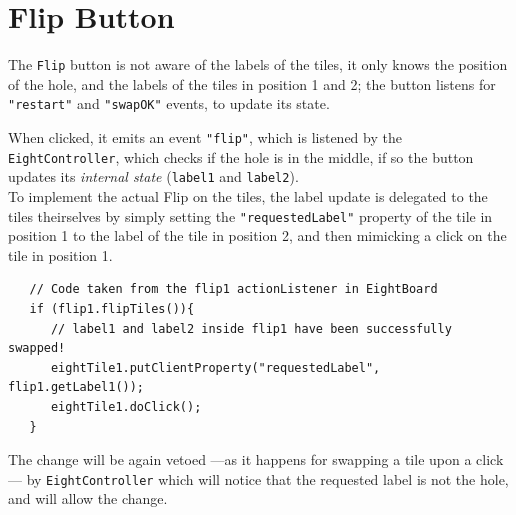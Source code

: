 
\section{Flip Button}

The \lstinline|Flip| button is not aware of the labels of the tiles, it only knows the position of the hole, and the labels of the tiles in position 1 and 2; the button listens for \lstinline|"restart"| and \lstinline|"swapOK"| events, to update its state.

When clicked, it emits an event \lstinline|"flip"|, which is listened by the \lstinline|EightController|, which checks if the hole is in the middle, if so the button updates its \textit{internal state} (\lstinline|label1| and \lstinline|label2|).\\
To implement the actual Flip on the tiles, the label update is delegated to the tiles theirselves by simply setting the \lstinline|"requestedLabel"| property of the tile in position 1 to the label of the tile in position 2, and then mimicking a click on the tile in position 1.

\begin{lstlisting}
   // Code taken from the flip1 actionListener in EightBoard
   if (flip1.flipTiles()){
      // label1 and label2 inside flip1 have been successfully swapped!
      eightTile1.putClientProperty("requestedLabel", flip1.getLabel1());
      eightTile1.doClick();
   }
\end{lstlisting}

The change will be again vetoed ---as it happens for swapping a tile upon a click--- by \lstinline|EightController| which will notice that the requested label is not the hole, and will allow the change.
